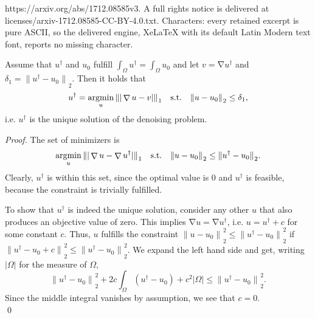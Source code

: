 \documentclass[10pt,a4paper]{amsart}
\DeclareMathOperator*{\argmin}{argmin}
\DeclareMathOperator{\grad}{\nabla}
\newcommand{\abs}[1]{|#1|}
\newcommand{\norm}[2][]{{\|{#2}\|_{}}_{#1}}
\newcommand{\subjectto}{\text{\quad s.t.\quad }}
\newcommand{\udag}{u^{\dagger}}
\begin{document}
https://arxiv.org/abs/1712.08585v3. A full rights notice is delivered at licenses/arxiv-1712.08585-CC-BY-4.0.txt. Characters: every retained excerpt is pure ASCII, so the delivered engine, XeLaTeX with its default Latin Modern text font, reports no missing character.
\begin{lemma}
  \label{lem:perfect-reconstruction-udag}
  Assume that $\udag$ and $u_{0}$ fulfill $\int_{\Omega}\udag = \int_{\Omega}u_{0}$ and
  let $v = \grad \udag$ and $\delta_{1} = \norm[2]{\udag-u_{0}}$. Then it holds that
  \begin{equation}
    \label{eq:tvgrad-true-delta}
    \udag = \argmin_u \norm[1]{\abs{\grad u-v}}
    \subjectto\norm[2]{u-u_0}\leq \delta_{1},
  \end{equation}
  i.e. $\udag$ is the unique solution of the denoising problem.
\end{lemma}

\begin{proof}
  The set of minimizers is
  \begin{align*}
    \argmin_{u}\norm[1]{\abs{\grad u - \grad\udag}}
    \subjectto \norm[2]{u-u_0}
    \leq\norm[2]{\udag - u_0}.
  \end{align*}
  Clearly, $\udag$ is within this set, since the optimal value
  is $0$ and $\udag$ is feasible, because the constraint is 
  trivially fulfilled.
  
  To show that $\udag$ is indeed the unique solution, consider any other $u$ that also produces an objective value of zero.
  This implies $\grad u = \grad\udag$, i.e. $u = \udag + c$ for some constant $c$.
  Thus, $u$ fulfills the constraint $\norm[2]{u-u_{0}}^{2}\leq \norm[2]{\udag-u_{0}}^{2}$ if $\norm[2]{\udag-u_{0} + c}^{2}\leq \norm[2]{\udag-u_{0}}^{2}$.
  We expand the left hand side and get, writing $\abs{\Omega}$ for the measure of $\Omega$,
  \[
  \norm[2]{\udag-u_{0}}^{2} + 2c\int_{\Omega}(\udag-u_{0}) + c^{2}\abs{\Omega} \leq \norm[2]{\udag-u_{0}}^{2}.
  \]
  Since the middle integral vanishes by assumption, we see that $c=0$.\\
  \qed
\end{proof}
\end{document}
